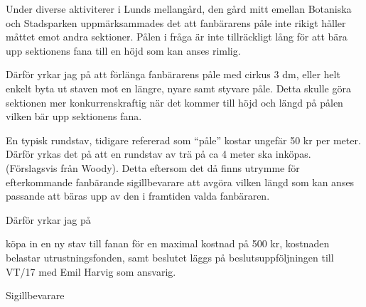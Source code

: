 \documentclass[../_main/handlingar.tex]{subfiles}
\begin{document}

Under diverse aktiviterer i Lunds mellangård, den gård mitt emellan Botaniska och Stadsparken uppmärksammades det att fanbärarens påle inte rikigt håller måttet emot andra sektioner. Pålen i fråga är inte tillräckligt lång för att bära upp sektionens fana till en höjd som kan anses rimlig.

Därför yrkar jag på att förlänga fanbärarens påle med cirkus 3 dm, eller helt enkelt byta ut staven mot en längre, nyare samt styvare påle. Detta skulle göra sektionen mer konkurrenskraftig när det kommer till höjd och längd på pålen vilken bär upp sektionens fana.

En typisk rundstav, tidigare refererad som ``påle'' kostar ungefär 50 kr per meter. Därför yrkas det på att en rundstav av trä på ca 4 meter ska inköpas. (Förslagsvis från Woody). Detta eftersom det då finns utrymme för efterkommande fanbärande sigillbevarare att avgöra vilken längd som kan anses passande att bäras upp av den i framtiden valda fanbäraren.

Därför yrkar jag på

\begin{attsatser}
    \att köpa in en ny stav till fanan för en maximal kostnad på 500 kr,
    \att kostnaden belastar utrustningsfonden, samt
    \att beslutet läggs på beslutsuppföljningen till VT/17 med Emil Harvig som ansvarig.
\end{attsatser}

\begin{signatures}{1}
    \mvh
    \signature{Emil Harvig}{Sigillbevarare}
\end{signatures}
\end{document}
